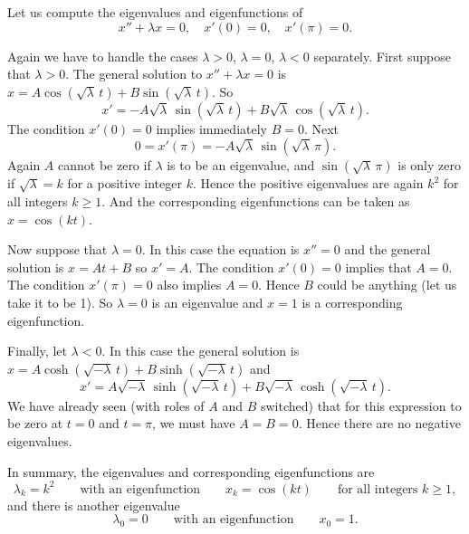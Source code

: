 \begin{example}
Let us compute the 
 eigenvalues and eigenfunctions of
\begin{equation*}
x'' + \lambda x = 0, \quad x'(0) = 0, \quad x'(\pi) = 0 .
\end{equation*}

Again we have to handle the cases $\lambda > 0$, $\lambda = 0$, $\lambda
< 0$ separately.
First suppose that $\lambda > 0$.
The general solution to $x''+\lambda x = 0$ is
$x = A \cos ( \sqrt{\lambda}\, t) + B \sin ( \sqrt{\lambda}\, t)$.  So
\begin{equation*}
x' = -A\sqrt{\lambda}\, \sin ( \sqrt{\lambda}\, t) + B\sqrt{\lambda}\,
\cos (\sqrt{\lambda}\, t) .
\end{equation*}
The condition $x'(0) = 0$ implies immediately $B = 0$.
Next
\begin{equation*}
0 = x'(\pi) = -A\sqrt{\lambda}\, \sin ( \sqrt{\lambda}\, \pi) .
\end{equation*}
Again $A$ cannot be zero if $\lambda$ is to be an eigenvalue,
and $\sin ( \sqrt{\lambda}\, \pi)$ is only zero
if
$\sqrt{\lambda} = k$ for a positive integer $k$.
Hence the positive eigenvalues are again
$k^2$ for all integers $k \geq 1$.  And the corresponding eigenfunctions
can be taken as $x=\cos (k t)$.

Now suppose that $\lambda = 0$.  In this case the equation is $x'' = 0$
and the general solution is $x = At + B$ so $x' = A$.  The condition
$x'(0) = 0$ implies that
$A=0$.  The condition $x'(\pi) = 0$ also implies $A=0$.
Hence $B$ could be anything (let us take it to be 1).  So $\lambda = 0$
is an eigenvalue and $x=1$ is a corresponding eigenfunction.

Finally, let $\lambda < 0$.  In this case the general solution is
$x = A \cosh ( \sqrt{-\lambda}\, t) + B \sinh ( \sqrt{-\lambda}\, t)$
and
\begin{equation*}
x' = A\sqrt{-\lambda}\, \sinh ( \sqrt{-\lambda}\, t)
+ B\sqrt{-\lambda}\, \cosh ( \sqrt{-\lambda}\, t ) .
\end{equation*}
We have already seen (with roles of $A$ and $B$ switched) that for this
expression to be zero at $t=0$ and $t=\pi$, we must have $A=B=0$.  Hence there are
no negative eigenvalues.

In summary, the eigenvalues and corresponding eigenfunctions are
\begin{equation*}
\lambda_k = k^2 \qquad \text{with an eigenfunction} \qquad x_k = \cos (k t)
\qquad \text{for all integers } k \geq 1 ,
\end{equation*}
and there is another eigenvalue
\begin{equation*}
\lambda_0 = 0 \qquad \text{with an eigenfunction} \qquad x_0 = 1.
\end{equation*}
\end{example}

